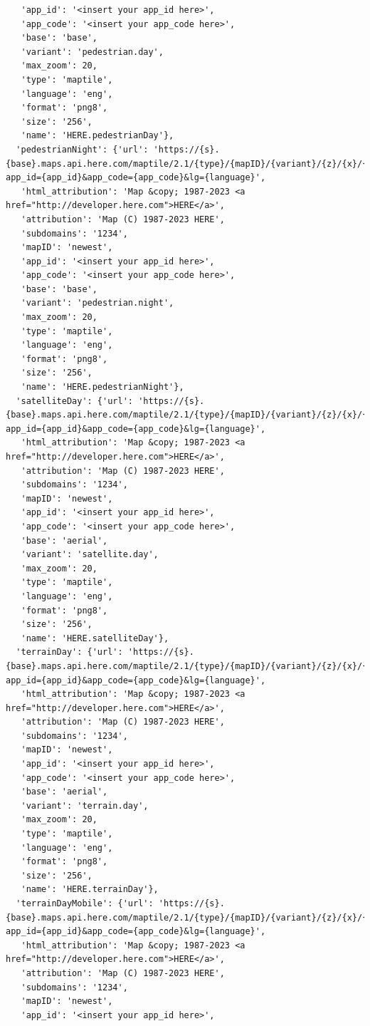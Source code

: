 \documentclass[
  letterpaper,
  DIV=11,
  numbers=noendperiod]{scrreprt}
\begin{document}
\begin{verbatim}
   'app_id': '<insert your app_id here>',
   'app_code': '<insert your app_code here>',
   'base': 'base',
   'variant': 'pedestrian.day',
   'max_zoom': 20,
   'type': 'maptile',
   'language': 'eng',
   'format': 'png8',
   'size': '256',
   'name': 'HERE.pedestrianDay'},
  'pedestrianNight': {'url': 'https://{s}.{base}.maps.api.here.com/maptile/2.1/{type}/{mapID}/{variant}/{z}/{x}/{y}/{size}/{format}?app_id={app_id}&app_code={app_code}&lg={language}',
   'html_attribution': 'Map &copy; 1987-2023 <a href="http://developer.here.com">HERE</a>',
   'attribution': 'Map (C) 1987-2023 HERE',
   'subdomains': '1234',
   'mapID': 'newest',
   'app_id': '<insert your app_id here>',
   'app_code': '<insert your app_code here>',
   'base': 'base',
   'variant': 'pedestrian.night',
   'max_zoom': 20,
   'type': 'maptile',
   'language': 'eng',
   'format': 'png8',
   'size': '256',
   'name': 'HERE.pedestrianNight'},
  'satelliteDay': {'url': 'https://{s}.{base}.maps.api.here.com/maptile/2.1/{type}/{mapID}/{variant}/{z}/{x}/{y}/{size}/{format}?app_id={app_id}&app_code={app_code}&lg={language}',
   'html_attribution': 'Map &copy; 1987-2023 <a href="http://developer.here.com">HERE</a>',
   'attribution': 'Map (C) 1987-2023 HERE',
   'subdomains': '1234',
   'mapID': 'newest',
   'app_id': '<insert your app_id here>',
   'app_code': '<insert your app_code here>',
   'base': 'aerial',
   'variant': 'satellite.day',
   'max_zoom': 20,
   'type': 'maptile',
   'language': 'eng',
   'format': 'png8',
   'size': '256',
   'name': 'HERE.satelliteDay'},
  'terrainDay': {'url': 'https://{s}.{base}.maps.api.here.com/maptile/2.1/{type}/{mapID}/{variant}/{z}/{x}/{y}/{size}/{format}?app_id={app_id}&app_code={app_code}&lg={language}',
   'html_attribution': 'Map &copy; 1987-2023 <a href="http://developer.here.com">HERE</a>',
   'attribution': 'Map (C) 1987-2023 HERE',
   'subdomains': '1234',
   'mapID': 'newest',
   'app_id': '<insert your app_id here>',
   'app_code': '<insert your app_code here>',
   'base': 'aerial',
   'variant': 'terrain.day',
   'max_zoom': 20,
   'type': 'maptile',
   'language': 'eng',
   'format': 'png8',
   'size': '256',
   'name': 'HERE.terrainDay'},
  'terrainDayMobile': {'url': 'https://{s}.{base}.maps.api.here.com/maptile/2.1/{type}/{mapID}/{variant}/{z}/{x}/{y}/{size}/{format}?app_id={app_id}&app_code={app_code}&lg={language}',
   'html_attribution': 'Map &copy; 1987-2023 <a href="http://developer.here.com">HERE</a>',
   'attribution': 'Map (C) 1987-2023 HERE',
   'subdomains': '1234',
   'mapID': 'newest',
   'app_id': '<insert your app_id here>',

\end{verbatim}
\end{document}

